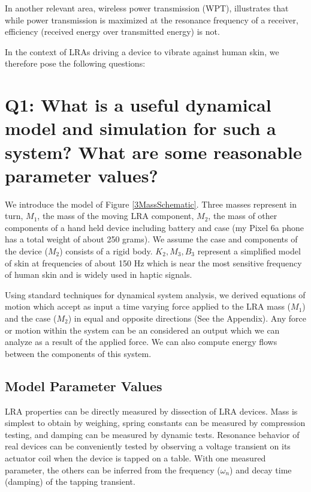 \documentclass[letterpaper,11pt]{article}
\begin{document}
In another relevant area, wireless power transmission (WPT), \cite{yamaguchi2014resonance}
illustrates that while power transmission is maximized at the resonance frequency of a
receiver, efficiency (received energy over transmitted energy) is not.

In the context of LRAs driving a device to vibrate against human skin, we therefore pose
the following questions:

\section{Q1: What is a useful dynamical model and simulation for such a system? What are some reasonable parameter values?}

We introduce the model of Figure \ref{3MassSchematic}.
Three masses represent in turn,
$M_1$, the mass of the moving LRA component,
$M_2$, the mass of other components of a hand held device including battery
and case
(my Pixel 6a phone
has a total weight of about 250 grams).
We assume the case and components of the device ($M_2$)
consists of   a rigid body.
$K_2, M_3, B_3$ represent a simplified model of skin at frequencies of about 150 Hz which is
near the most sensitive frequency of human skin and is widely used in haptic signals.

Using standard techniques for dynamical system analysis, we derived   equations
of motion   which accept as input a time varying force
applied to the LRA mass ($M_1$) and the case ($M_2$) in equal and opposite directions
(See the Appendix).   Any force or motion within the system can be an considered
an output which we can
analyze as a result of the applied force.  We can also compute energy flows between
the components of this system.

\subsection{Model Parameter Values}
LRA properties can be directly measured by dissection of LRA devices.  Mass is simplest to obtain by weighing, spring constants can be measured by
compression testing, and damping can be measured by dynamic tests.
Resonance behavior of real devices can be conveniently tested by observing
a voltage transient on its actuator coil when the device is tapped on a table.   With one measured parameter, the others can be inferred from the
frequency ($\omega_n$) and decay time (damping) of the tapping transient.
\end{document}
